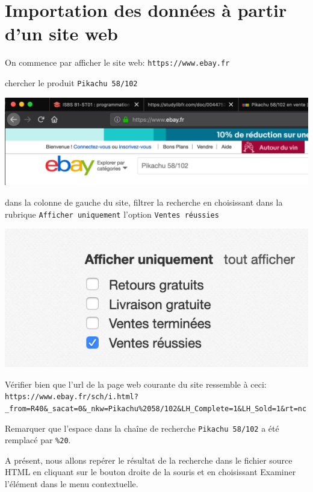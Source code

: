 \documentclass[a4paper]{article}
\begin{document}
\section{Importation des données à partir d'un site web}
On commence  par afficher le site web: {\tt https://www.ebay.fr}

chercher le produit {\tt Pikachu 58/102}

\begin{center}
\includegraphics[scale=0.5]{ebay1.png} 
\end{center}
dans la colonne de gauche du site, filtrer la recherche en choisissant dans la rubrique {\tt Afficher uniquement} l'option {\tt Ventes réussies}
\begin{center}
\includegraphics[scale=0.5]{ebay2.png} 
\end{center}
Vérifier bien que l'url de la page web courante du site ressemble à ceci:\\
{\tt https://www.ebay.fr/sch/i.html?\_from=R40\&\_sacat=0\&\_nkw=Pikachu\%2058/102\&LH\_Complete=1\&LH\_Sold=1\&rt=nc}

Remarquer que l'espace dans la chaîne de recherche {\tt Pikachu 58/102} a été remplacé par {\tt \%20}.

A présent, nous allons repérer le résultat de la recherche dans le fichier source HTML en cliquant sur le bouton droite de la souris et en choisissant Examiner l'élément dans le menu contextuelle.
\end{document}
